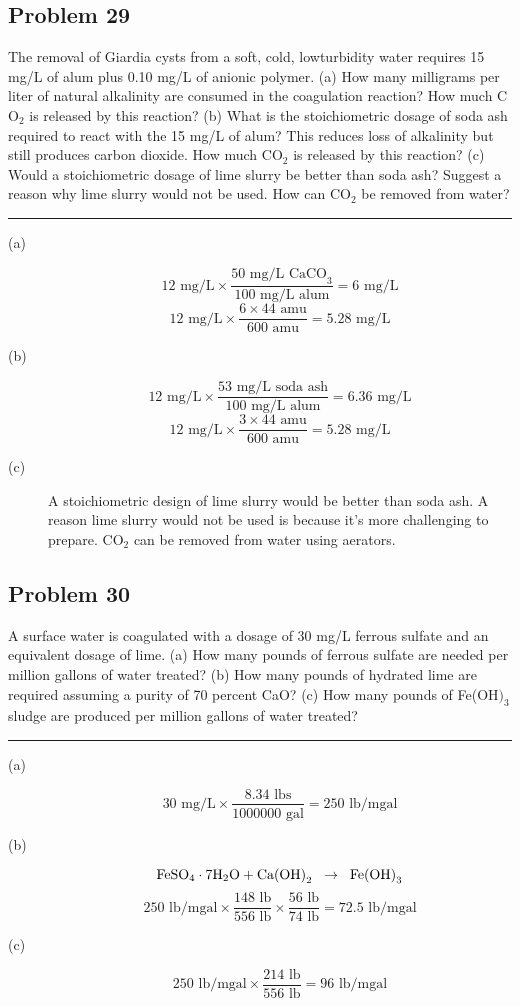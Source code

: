\subsection*{Problem 29}
The removal of Giardia cysts from a soft, cold, lowturbidity water requires 15 mg/L of alum plus 0.10 mg/L of anionic polymer. (a) How many milligrams per liter of natural alkalinity are consumed in the coagulation reaction? How much C\(\text{O}_2\) is released by this reaction? (b) What is the stoichiometric dosage of soda ash required to react with the 15 mg/L of alum? This reduces loss of alkalinity but still produces carbon dioxide. How much C\(\text{O}_2\) is released by this reaction? (c) Would a stoichiometric dosage of lime slurry be better than soda ash? Suggest a reason why lime slurry would not be used. How can C\(\text{O}_2\) be removed from water?
\\\rule{5cm}{1pt}
\begin{description}
    \item[(a)]
    \[12\text{ mg/L}\times\frac{50\text{ mg/L CaCO}_3}{100 \text{ mg/L alum}}=\boxed{6\text{ mg/L}}\]
    \[12\text{ mg/L}\times\frac{6\times44\text{ amu}}{600\text{ amu}}=\boxed{5.28\text{ mg/L}}\]
    \item[(b)]
    \[12\text{ mg/L}\times\frac{53\text{ mg/L soda ash}}{100 \text{ mg/L alum}}=\boxed{6.36\text{ mg/L}}\]
    \[12\text{ mg/L}\times\frac{3\times44\text{ amu}}{600\text{ amu}}=\boxed{5.28\text{ mg/L}}\]
    \item[(c)] A stoichiometric design of lime slurry would be better than soda ash. A reason lime slurry would not be used is because it's more challenging to prepare. C\(\text{O}_2\) can be removed from water using aerators.
\end{description}
\newpage
\subsection*{Problem 30}
A surface water is coagulated with a dosage of 30 mg/L ferrous sulfate and an equivalent dosage of lime. (a) How many pounds of ferrous sulfate are needed per million gallons of water treated? (b) How many pounds of hydrated lime are required assuming a purity of 70 percent CaO? (c) How many pounds of Fe(O\(\text{H)}_3\) sludge are produced per million gallons of water treated?
\\\rule{5cm}{1pt}
\begin{description}
    \item[(a)]
    \[30\text{ mg/L}\times\frac{8.34\text{ lbs}}{1000000 \text{ gal}}=\boxed{250 \text{ lb/mgal}}\]
    \item[(b)]
    \[\text{FeSO}_4\cdot7\text{H}_2\text{O}+\text{Ca(OH)}_2\hspace{2mm}\rightarrow\hspace{2mm}\text{Fe(OH)}_3\]
    \[250\text{ lb/mgal}\times\frac{\text{148 lb}}{\text{556 lb}}\times\frac{\text{56 lb}}{\text{74 lb}}=\boxed{72.5 \text{ lb/mgal}}\]
    \item[(c)] 
    \[250\text{ lb/mgal}\times\frac{\text{214 lb}}{\text{556 lb}}=\boxed{96 \text{ lb/mgal}}\]
\end{description}
